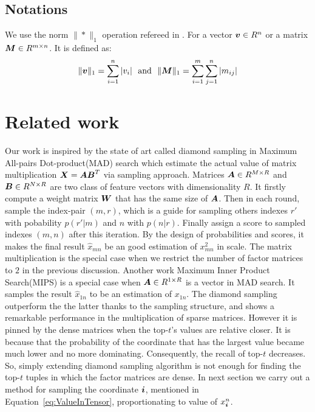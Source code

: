 \documentclass[letterpaper]{article}
\newcommand{\V}[1]{{\bm{{\MakeLowercase{#1}}}}}
\newcommand{\M}[1]{{\bm{{\MakeUppercase{#1}}}}}
\newcommand{\norm}[2]{\|#1\|_{#2}}
\newcommand{\Eqn}[1]   {Equation~\ref{eq:#1}}
\newcommand{\Table}[1] {Table~\ref{table:#1}}
\begin{document}
\subsection{Notations}

We use the norm $\norm{*}{1}$ operation refereed in \cite{BaPiKoSe15}.
For a vector $\V{v}\in R^n$ or a matrix $\M{M}\in R^{m\times n}$.
It is defined as:
\[
    \norm{\V{v}}{1} = \sum_{i=1}^{n}|v_i|
    \ \  {\rm and} \ \
    \norm{\M{M}}{1} = \sum_{i=1}^{m}\sum_{j=1}^{n}|m_{ij}|
\]


\section{Related work}
Our work is inspired by the state of art called diamond sampling
in Maximum All-pairs Dot-product(MAD) search\cite{BaPiKoSe15}
which estimate the actual value of matrix multiplication
$\M{X} = \M{A}\M{B}^T$ via sampling approach.
Matrices $\M{A}\in R^{M\times R}$ and $\M{B}\in R^{N\times R}$ 
are two class of feature vectors with dimensionality $R$.
It firstly compute a weight matrix $\M{W}$ that has the same size of $\M{A}$.
Then in each round, sample the index-pair $(m,r)$,
which is a guide for sampling others indexes $r'$ with pobability
$p(r'|m)$ and $n$ with $p(n|r)$.
Finally assign a score to sampled indexes ${(m,n)}$ after this iteration.
By the design of probabilities and scores,
it makes the final result $\widehat{x}_{mn}$ be an good estimation of $x^2_{mn}$ in scale.
The matrix multiplication is the special case
when we restrict the number of factor matrices to $2$ in the previous discussion.
Another work Maximum Inner Product Search(MIPS)\cite{Cohen97}
is a special case when $\M{A}\in R^{1\times R}$ is a vector in MAD search.
It samples the result $\widehat{x}_{1n}$ to be an estimation of $x_{1n}$.
The diamond sampling outperform the the latter thanks to the sampling structure,
and shows a remarkable performance in the multiplication of sparse matrices.
However it is pinned by the dense matrices when the top-$t$'s values are relative closer.
It is because that the probability of the coordinate that has the largest value became much lower
and no more dominating.
Consequently, the recall of top-$t$ decreases.
So, simply extending diamond sampling algorithm is not enough 
for finding the top-$t$ tuples in which the factor matrices are dense.
In next section we carry out a method for sampling the coordinate $\V{i}$,
mentioned in \Eqn{ValueInTensor},
proportionating to value of $x^n_{\V{i}}$.
\end{document}
